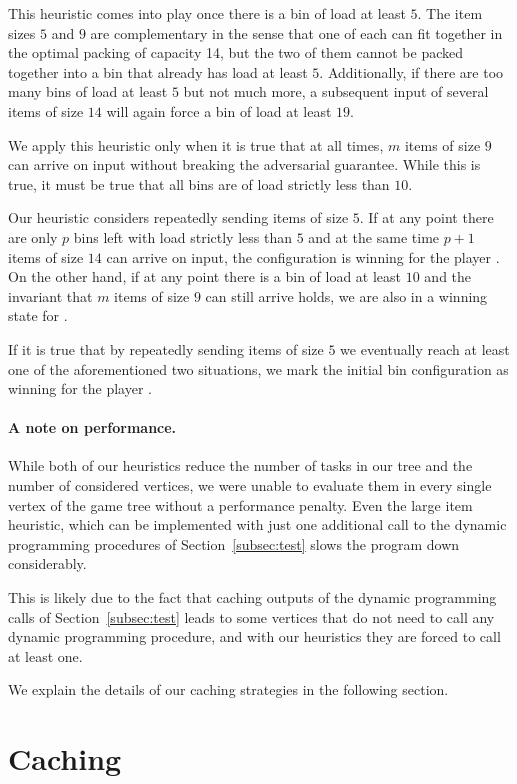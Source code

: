 This heuristic comes into play once there is a bin of load at least
$5$. The item sizes $5$ and $9$ are complementary in the sense that
one of each can fit together in the optimal packing of capacity 14,
but the two of them cannot be packed together into a bin that already
has load at least $5$. Additionally, if there are too many bins of
load at least $5$ but not much more, a subsequent input of several
items of size $14$ will again force a bin of load at least $19$.

We apply this heuristic only when it is true that at all times, $m$
items of size $9$ can arrive on input without breaking the adversarial
guarantee. While this is true, it must be true that all bins are of
load strictly less than $10$.

Our heuristic considers repeatedly sending items of size $5$. If at
any point there are only $p$ bins left with load strictly less than
$5$ and at the same time $p+1$ items of size $14$ can arrive on input,
the configuration is winning for the player \adversary. On the other
hand, if at any point there is a bin of load at least $10$ and the
invariant that $m$ items of size $9$ can still arrive holds, we are
also in a winning state for \adversary.

If it is true that by repeatedly sending items of size $5$ we
eventually reach at least one of the aforementioned two situations,
we mark the initial bin configuration as winning for the player
\adversary.

\paragraph{A note on performance.} While both of our heuristics reduce
the number of tasks in our tree and the number of considered vertices,
we were unable to evaluate them in every single vertex of the game
tree without a performance penalty. Even the large item heuristic,
which can be implemented with just one additional call to the dynamic
programming procedures of Section~\ref{subsec:test} slows the program
down considerably.

This is likely due to the fact that caching outputs of the dynamic
programming calls of Section~\ref{subsec:test} leads to some vertices
that do not need to call any dynamic programming procedure, and with
our heuristics they are forced to call at least one.

We explain the details of our caching strategies in the following
section.

\section{Caching}\label{sec:4:caching}

